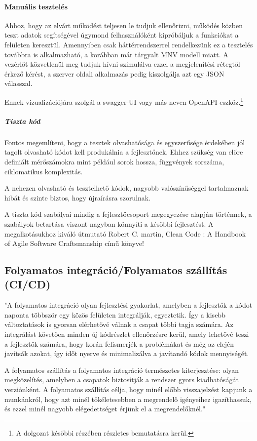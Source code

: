 \paragraph{Manuális tesztelés}

Ahhoz, hogy az elvárt működést teljesen le tudjuk ellenőrizni, működés közben teszt adatok segítségével úgymond felhasználóként kipróbáljuk a funkciókat a felületen keresztül. Amennyiben csak háttérrendszerrel rendelkezünk ez a tesztelés továbbra is alkalmazható, a korábban már tárgyalt MNV modell miatt. A vezérlőt közvetlenül meg tudjuk hívni szimulálva ezzel a megjelenítési rétegtől érkező kérést, a szerver oldali alkalmazás pedig kiszolgálja azt egy JSON válasszal.

Ennek vizualizációjára szolgál a swagger-UI vagy más neven OpenAPI eszköz.\footnote{A dolgozat későbbi részében részletes bemutatásra kerül.}

\subparagraph{Tiszta kód}

Fontos megemlíteni, hogy a tesztek olvashatósága és egyszerűsége érdekében jól tagolt olvasható kódot kell produkálnia a fejlesztőnek. Ehhez szükség van előre definiált mérőszámokra mint például sorok hossza, függvények sorszáma, ciklomatikus komplexitás.

A nehezen olvasható és tesztelhető kódok, nagyobb valószínűséggel tartalmaznak hibát és szinte biztos, hogy újraírásra szorulnak.

A tiszta kód szabályai mindig a fejlesztőcsoport megegyezése alapján történnek, a szabályok betartása viszont nagyban könnyíti a későbbi fejlesztést. A megalkotásukhoz kiváló útmutató Robert C. martin, Clean Code : A Handbook of Agile Software Craftsmanship\cite{cleanCode} című könyve!

\subsection{Folyamatos integráció/Folyamatos szállítás (CI/CD)}

"A folyamatos integráció olyan fejlesztési gyakorlat, amelyben a fejlesztők a kódot naponta többször egy közös felületen integrálják, egyeztetik. Így a kisebb változtatások is gyorsan elérhetővé válnak a csapat többi tagja számára. Az integrálást követően minden új kódrészlet ellenőrzésre kerül, amely lehetővé teszi a fejlesztők számára, hogy korán felismerjék a problémákat és még az elején javítsák azokat, így időt nyerve és minimalizálva a javítandó kódok mennyiségét.

A folyamatos szállítás a folyamatos integráció természetes kiterjesztése: olyan megközelítés, amelyben a csapatok biztosítják a rendszer gyors kiadhatóságát verziónként. A folyamatos szállítás célja, hogy minél előbb visszajelzést kapjunk a munkánkról, hogy azt minél tökéletesebben a megrendelő igényeihez igazíthassuk, és ezzel minél nagyobb elégedettséget érjünk el a megrendelőknél."\cite{CICD}

